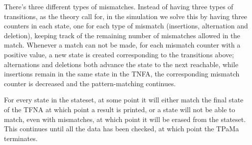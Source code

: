 There's three different types of mismatches. Instead of having three types of transitions, as the theory call for, in the simulation we solve this by having three counters in each state, one for each type of mismatch (insertions, alternation and deletion), keeping track of the remaining number of mismatches allowed in the match. Whenever a match can not be made, for each mismatch counter with a positive value, a new state is created corresponding to the transitions above; alternations and deletions both advance the state to the next reachable, while insertions remain in the same state in the TNFA, the corresponding mismatch counter is decreased and the pattern-matching continues.

For every state in the stateset, at some point it will either match the final state of the TFNA at which point a result is printed, or a state will not be able to match, even with mismatches, at which point it will be erased from the stateset. This continues until all the data has been checked, at which point the TPaMa terminates.